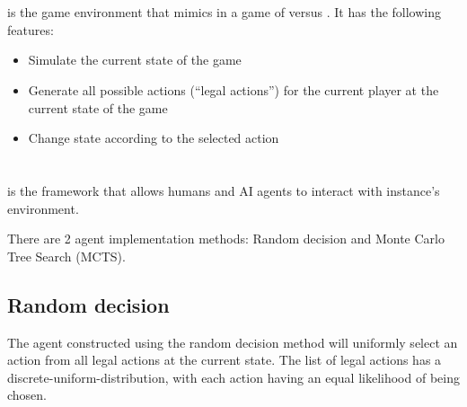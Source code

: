 \section{\RootOurs}
\RootOurs{} is the game environment that mimics \RootV{} in a game of \Marquise{} versus \Eyrie. It has the following features:
\begin{itemize}
  \item Simulate the current state of the game
  \item Generate all possible actions (``legal actions'') for the current player at the current state of the game
  \item Change state according to the selected action 
\end{itemize}

\section{\RootAI} \label{ch3-root-trainer}
\RootAI{} is the framework that allows humans and AI agents to interact with \RootOurs{} instance's environment.

There are 2 agent implementation methods: Random decision and Monte Carlo Tree Search (MCTS).

\subsection{Random decision}
The agent constructed using the random decision method will uniformly select an action from all legal actions at the current state. The list of legal actions has a \gls{discrete-uniform-distribution}, with each action having an equal likelihood of being chosen. %


